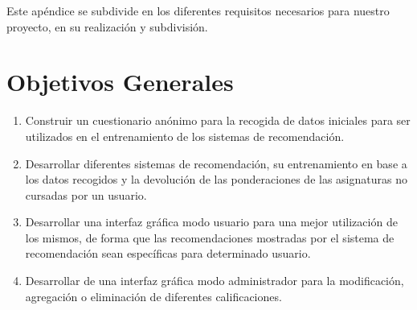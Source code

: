 Este apéndice se subdivide en los diferentes requisitos necesarios para nuestro proyecto, en su realización y subdivisión. 
\section{Objetivos Generales}
\begin{enumerate}
\item Construir un cuestionario anónimo para la recogida de datos iniciales para ser utilizados en el entrenamiento de los sistemas de recomendación. 
\item Desarrollar  diferentes sistemas de recomendación, su entrenamiento en base a los datos recogidos y la devolución de las ponderaciones de las asignaturas no cursadas por un usuario. 
\item Desarrollar una interfaz gráfica modo usuario para una mejor utilización de los mismos, de forma que las recomendaciones mostradas por el sistema de recomendación sean específicas para determinado usuario. 
\item Desarrollar de una interfaz gráfica modo administrador para la modificación, agregación o eliminación de diferentes calificaciones. 
\end{enumerate}
